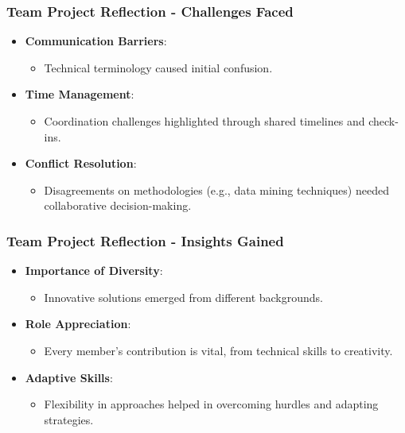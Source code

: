 \documentclass[aspectratio=169]{beamer}
\begin{document}
\begin{frame}[fragile]
    \frametitle{Team Project Reflection - Challenges Faced}
    \begin{itemize}
        \item \textbf{Communication Barriers}:
            \begin{itemize}
                \item Technical terminology caused initial confusion.
            \end{itemize}
        \item \textbf{Time Management}:
            \begin{itemize}
                \item Coordination challenges highlighted through shared timelines and check-ins.
            \end{itemize}
        \item \textbf{Conflict Resolution}:
            \begin{itemize}
                \item Disagreements on methodologies (e.g., data mining techniques) needed collaborative decision-making.
            \end{itemize}
    \end{itemize}
\end{frame}

\begin{frame}[fragile]
    \frametitle{Team Project Reflection - Insights Gained}
    \begin{itemize}
        \item \textbf{Importance of Diversity}:
            \begin{itemize}
                \item Innovative solutions emerged from different backgrounds.
            \end{itemize}
        \item \textbf{Role Appreciation}:
            \begin{itemize}
                \item Every member's contribution is vital, from technical skills to creativity.
            \end{itemize}
        \item \textbf{Adaptive Skills}:
            \begin{itemize}
                \item Flexibility in approaches helped in overcoming hurdles and adapting strategies.
            \end{itemize}
    \end{itemize}
\end{frame}
\end{document}
